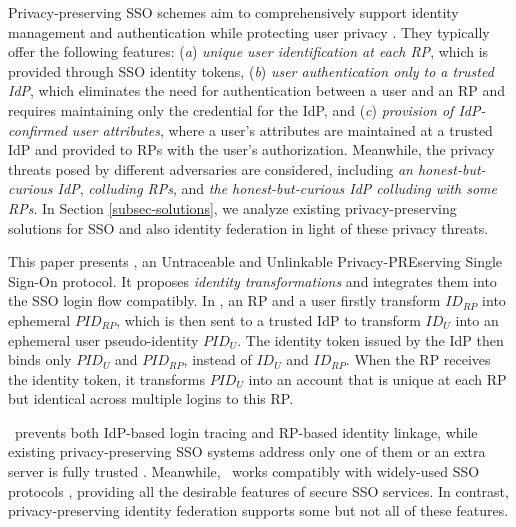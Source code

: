 Privacy-preserving SSO schemes aim to comprehensively support identity management and authentication while protecting user privacy \cite{maler2008venn, NIST2017draft, BrowserID, SPRESSO}.
They typically offer the following features:
(\emph{a}) \emph{unique user identification at each RP}, which is provided through SSO identity tokens,
(\emph{b}) \emph{user authentication only to a trusted IdP},
which eliminates the need for authentication between a user and an RP and requires maintaining only the credential for the IdP,
and (\emph{c}) \emph{provision of IdP-confirmed user attributes},
 where a user's attributes are maintained at a trusted IdP and provided to RPs with the user's authorization.
Meanwhile, the privacy threats posed by different adversaries are considered, including \emph{an honest-but-curious IdP}, \emph{colluding RPs}, and \emph{the honest-but-curious IdP colluding with some RPs}.
In Section \ref{subsec-solutions}, we analyze existing privacy-preserving solutions for SSO and also identity federation in light of these privacy threats.


This paper presents \usso, an Untraceable and Unlinkable Privacy-PREserving Single Sign-On protocol.
It proposes {\em identity transformations} and integrates them into the SSO login flow compatibly.
In \usso, an RP and a user firstly transform $ID_{RP}$ into ephemeral $PID_{RP}$, which is then sent to a trusted IdP to transform $ID_U$ into an ephemeral user pseudo-identity $PID_U$.
The identity token issued by the IdP then binds only $PID_U$ and $PID_{RP}$, instead of $ID_U$ and $ID_{RP}$. When the RP receives the identity token, %
 it transforms $PID_U$ into an account that is unique at each RP but identical across multiple logins to this RP.


\usso\ prevents both IdP-based login tracing and RP-based identity linkage, while existing privacy-preserving SSO systems address only one of them \cite{BrowserID, SPRESSO, NIST2017draft, FirefoxAccount,save-flow} or an extra server is fully trusted \cite{miso}.
Meanwhile, \usso\ works compatibly with widely-used SSO protocols \cite{OpenIDConnect, rfc6749, SAML, NIST2017draft}, providing all the desirable features of secure SSO services.
In contrast, privacy-preserving identity federation \cite{PseudoID, ELPASSO, UnlimitID, Opaak, uprov, hyperledge-idemix} supports some but not all of these features.

